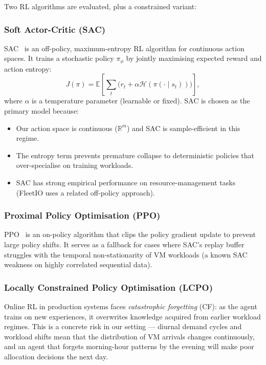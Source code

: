 \documentclass[11pt]{article}
\begin{document}
Two RL algorithms are evaluated, plus a constrained variant:

\subsubsection*{Soft Actor-Critic (SAC)}

SAC~\cite{haarnoja2018sac} is an off-policy, maximum-entropy RL algorithm
for continuous action spaces.  It trains a stochastic policy $\pi_\phi$ by
jointly maximising expected reward and action entropy:
\[
    J(\pi) = \mathbb{E}\!\left[\sum_t \bigl(r_t + \alpha \mathcal{H}(\pi(\cdot \mid s_t))\bigr)\right],
\]
where $\alpha$ is a temperature parameter (learnable or fixed).  SAC is chosen
as the primary model because:
\begin{itemize}
    \item Our action space is continuous ($\mathbb{R}^m$) and SAC is
          sample-efficient in this regime.
    \item The entropy term prevents premature collapse to deterministic
          policies that over-specialise on training workloads.
    \item SAC has strong empirical performance on resource-management tasks
          (FleetIO uses a related off-policy approach).
\end{itemize}

\subsubsection*{Proximal Policy Optimisation (PPO)}

PPO~\cite{schulman2017ppo} is an on-policy algorithm that clips the policy
gradient update to prevent large policy shifts.  It serves as a fallback for
cases where SAC's replay buffer struggles with the temporal non-stationarity
of VM workloads (a known SAC weakness on highly correlated sequential data).

\subsubsection*{Locally Constrained Policy Optimisation (LCPO)}

Online RL in production systems faces \emph{catastrophic forgetting} (CF):
as the agent trains on new experiences, it overwrites knowledge acquired
from earlier workload regimes.  This is a concrete risk in our setting ---
diurnal demand cycles and workload shifts mean that the distribution of
VM arrivals changes continuously, and an agent that forgets morning-hour
patterns by the evening will make poor allocation decisions the next day.
\end{document}
